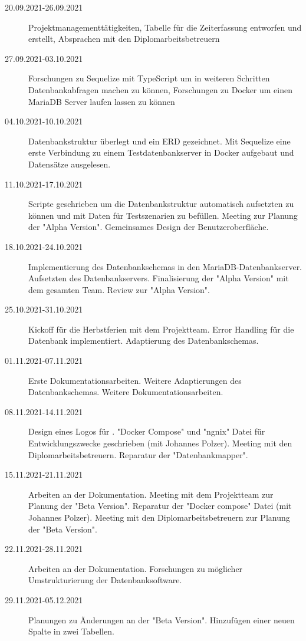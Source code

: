 
\begin{description}
    \item[20.09.2021-26.09.2021] Projektmanagementtätigkeiten, Tabelle für die Zeiterfassung entworfen und erstellt, Absprachen mit den Diplomarbeitsbetreuern
    \item[27.09.2021-03.10.2021] Forschungen zu Sequelize mit TypeScript um in weiteren Schritten Datenbankabfragen machen zu können, Forschungen zu Docker um einen MariaDB Server laufen lassen zu können
    \item[04.10.2021-10.10.2021] Datenbankstruktur überlegt und ein ERD gezeichnet. Mit Sequelize eine erste Verbindung zu einem Testdatenbankserver in Docker aufgebaut und Datensätze ausgelesen.
    \item[11.10.2021-17.10.2021] Scripte geschrieben um die Datenbankstruktur automatisch aufsetzten zu können und mit Daten für Testszenarien zu befüllen. Meeting zur Planung der "Alpha Version". Gemeinsames Design der Benutzeroberfläche.
    \item[18.10.2021-24.10.2021] Implementierung des Datenbankschemas in den Maria\-DB-Datenbankserver. Aufsetzten des Datenbankservers. Finalisierung der "Alpha Version" mit dem gesamten Team. Review zur "Alpha Version".
    \item[25.10.2021-31.10.2021] Kickoff für die Herbstferien mit dem Projektteam. Error\- Handling für die Datenbank implementiert. Adaptierung des Datenbankschemas.
    \item[01.11.2021-07.11.2021] Erste Dokumentationsarbeiten. Weitere Adaptierungen des Datenbankschemas. Weitere Dokumentationsarbeiten.
    \item[08.11.2021-14.11.2021] Design eines Logos für \ZELIA. "Docker Compose" und "ngnix" Datei für Entwicklungszwecke geschrieben (mit Johannes Polzer). Meeting mit den Diplomarbeitsbetreuern. Reparatur der "Datenbankmapper". 
    \item[15.11.2021-21.11.2021] Arbeiten an der Dokumentation. Meeting mit dem Projektteam zur Planung der "Beta Version". Reparatur der "Docker compose" Datei (mit Johannes Polzer). Meeting mit den Diplomarbeitsbetreuern zur Planung der "Beta Version".  
    \item[22.11.2021-28.11.2021] Arbeiten an der Dokumentation. Forschungen zu möglicher Umstrukturierung der Datenbanksoftware.
    \item[29.11.2021-05.12.2021] Planungen zu Änderungen an der "Beta Version". Hinzufügen einer neuen Spalte in zwei Tabellen. 

\end{description}
